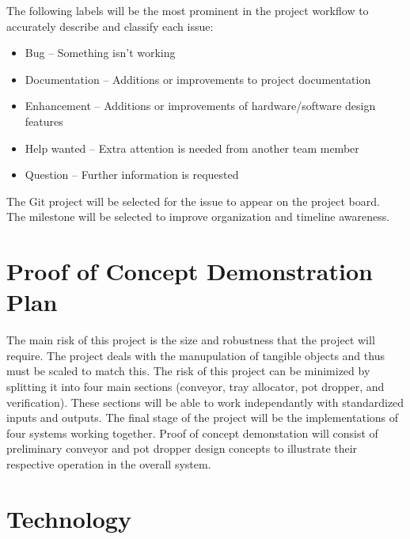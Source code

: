 \documentclass{article}
\begin{document}
	\noindent The following labels will be the most prominent in the project workflow to accurately describe and classify each issue: 

	\begin{itemize}
		\item Bug – Something isn’t working
		\item Documentation – Additions or improvements to project documentation 
		\item Enhancement – Additions or improvements of hardware/software design features 
		\item Help wanted – Extra attention is needed from another team member 
		\item Question – Further information is requested 
	\end{itemize}
	\noindent The Git project will be selected for the issue to appear on the project board.\\

	\noindent The milestone will be selected to improve organization and timeline awareness.\\
	
	\section{Proof of Concept Demonstration Plan}
	
	The main risk of this project is the size and robustness that the project will require. The project deals with the manupulation of tangible objects and thus must be scaled to match this.
	The risk of this project can be minimized by splitting it into four main sections (conveyor, tray allocator, pot dropper, and verification). These sections will be able to work independantly with standardized inputs and outputs. The final stage of the project will be 
	the implementations of four systems working together. 
	Proof of concept demonstation will consist of preliminary conveyor and pot dropper design concepts to illustrate their respective
	operation in the overall system.
	
	
	\section{Technology}
	
\end{document}
